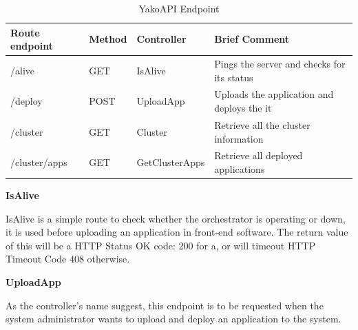                 \begin{table}[H]
                    \centering
                    \caption{YakoAPI Endpoint}
                    \begin{tabular}{|l|l|l|l|}
                    \hline
                    \rowcolor[HTML]{C0C0C0} 
                    \textbf{Route endpoint} & \textbf{Method} & \textbf{Controller} & \textbf{Brief Comment} \\ \hline
                    /alive & GET & IsAlive & Pings the server and checks for its status \\ \hline
                    /deploy & POST & UploadApp & Uploads the application and deploys the it \\ \hline
                    /cluster & GET & Cluster & Retrieve all the cluster information \\ \hline
                    /cluster/apps & GET & GetClusterApps & Retrieve all deployed applications \\ \hline
                    \end{tabular}
                    \label{tab:api_endpoints}
                \end{table}
            
                \textbf{IsAlive}
                
                IsAlive is a simple route to check whether the orchestrator is operating or down, it is used before uploading an application in front-end software. The return value of this will be a HTTP Status OK code: 200 for a, or will timeout HTTP Timeout Code 408 otherwise.
                
            
                \textbf{UploadApp}
                
                As the controller's name suggest, this endpoint is to be requested when the system administrator wants to upload and deploy an application to the system.
                
